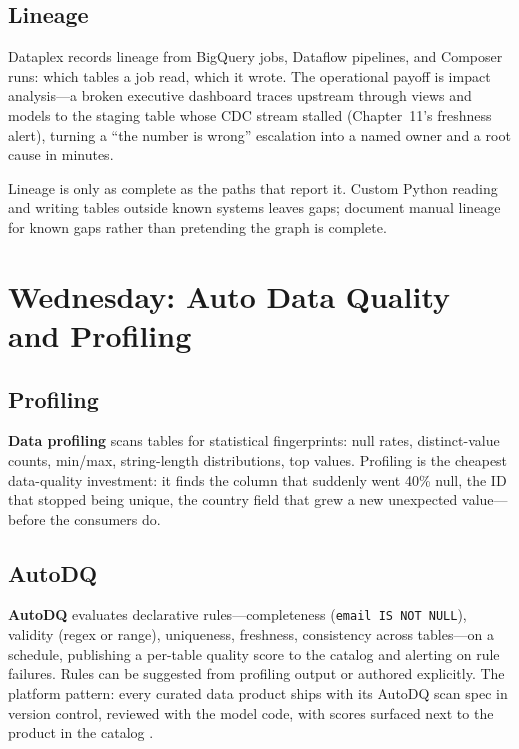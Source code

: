 \subsection{Lineage}
Dataplex records lineage from BigQuery jobs, Dataflow pipelines, and Composer runs: which tables a job read, which it wrote. The operational payoff is impact analysis---a broken executive dashboard traces upstream through views and models to the staging table whose CDC stream stalled (Chapter~11's freshness alert), turning a ``the number is wrong'' escalation into a named owner and a root cause in minutes.

\begin{notebox}
Lineage is only as complete as the paths that report it. Custom Python reading and writing tables outside known systems leaves gaps; document manual lineage for known gaps rather than pretending the graph is complete.
\end{notebox}

\section{Wednesday: Auto Data Quality and Profiling}

\subsection{Profiling}
\textbf{Data profiling} scans tables for statistical fingerprints: null rates, distinct-value counts, min/max, string-length distributions, top values. Profiling is the cheapest data-quality investment: it finds the column that suddenly went 40\% null, the ID that stopped being unique, the country field that grew a new unexpected value---before the consumers do.

\subsection{AutoDQ}
\textbf{AutoDQ} evaluates declarative rules---completeness (\texttt{email IS NOT NULL}), validity (regex or range), uniqueness, freshness, consistency across tables---on a schedule, publishing a per-table quality score to the catalog and alerting on rule failures. Rules can be suggested from profiling output or authored explicitly. The platform pattern: every curated data product ships with its AutoDQ scan spec in version control, reviewed with the model code, with scores surfaced next to the product in the catalog \cite{googleclouddataplexdocs}.

